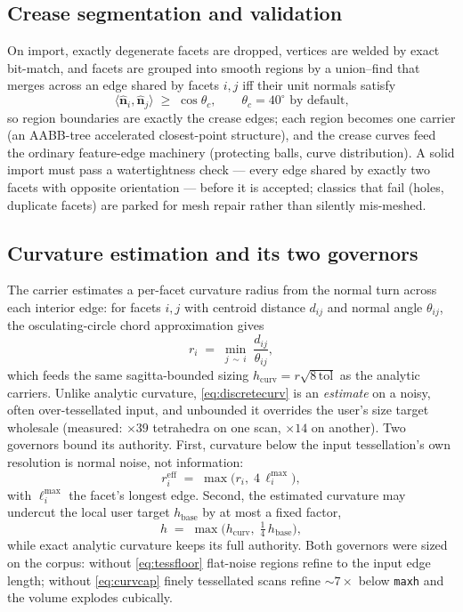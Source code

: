 \documentclass[11pt,a4paper]{article}
\numberwithin{equation}{section}
\newcommand{\vv}[1]{\mathbf{#1}}
\DeclareRobustCommand{\code}[1]{\texttt{#1}}
\begin{document}
\subsection{Crease segmentation and validation}
On import, exactly degenerate facets are dropped, vertices are welded by exact
bit-match, and facets are grouped into smooth regions by a union--find that
merges across an edge shared by facets $i,j$ iff their unit normals satisfy
\begin{equation}
\langle \hat{\vv n}_i, \hat{\vv n}_j\rangle \;\ge\; \cos\theta_c,
\qquad \theta_c = 40^\circ \text{ by default,}
\label{eq:crease}
\end{equation}
so region boundaries are exactly the crease edges; each region becomes one
carrier (an AABB-tree accelerated closest-point structure), and the crease
curves feed the ordinary feature-edge machinery (protecting balls, curve
distribution). A solid import must pass a watertightness check --- every edge
shared by exactly two facets with opposite orientation --- before it is
accepted; classics that fail (holes, duplicate facets) are parked for mesh
repair rather than silently mis-meshed.

\subsection{Curvature estimation and its two governors}
The carrier estimates a per-facet curvature radius from the normal turn across
each interior edge: for facets $i,j$ with centroid distance $d_{ij}$ and
normal angle $\theta_{ij}$, the osculating-circle chord approximation gives
\begin{equation}
r_i \;=\; \min_{j\,\sim\,i}\; \frac{d_{ij}}{\theta_{ij}},
\label{eq:discretecurv}
\end{equation}
which feeds the same sagitta-bounded sizing
$h_{\mathrm{curv}} = r\sqrt{8\,\mathrm{tol}}$ as the analytic carriers. Unlike
analytic curvature, \eqref{eq:discretecurv} is an \emph{estimate} on a noisy,
often over-tessellated input, and unbounded it overrides the user's size
target wholesale (measured: $\times39$ tetrahedra on one scan, $\times14$ on
another). Two governors bound its authority. First, curvature below the input
tessellation's own resolution is normal noise, not information:
\begin{equation}
r_i^{\mathrm{eff}} \;=\; \max\bigl(r_i,\; 4\,\ell_i^{\max}\bigr),
\label{eq:tessfloor}
\end{equation}
with $\ell_i^{\max}$ the facet's longest edge. Second, the estimated curvature
may undercut the local user target $h_{\mathrm{base}}$ by at most a fixed
factor,
\begin{equation}
h \;=\; \max\bigl(h_{\mathrm{curv}},\; \tfrac{1}{4}\,h_{\mathrm{base}}\bigr),
\label{eq:curvcap}
\end{equation}
while exact analytic curvature keeps its full authority. Both governors were
sized on the corpus: without \eqref{eq:tessfloor} flat-noise regions refine to
the input edge length; without \eqref{eq:curvcap} finely tessellated scans
refine $\sim7\times$ below \code{maxh} and the volume explodes cubically.
\end{document}
